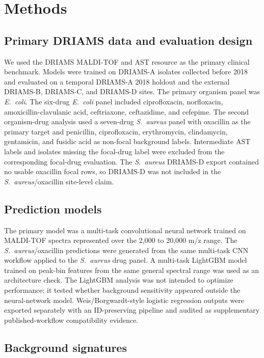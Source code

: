 \documentclass[11pt]{article}
\begin{document}
\section*{Methods}

\subsection*{Primary DRIAMS data and evaluation design}

We used the DRIAMS MALDI-TOF and AST resource as the primary clinical benchmark\cite{weis2022driams,driamsdryad}. Models were trained on DRIAMS-A isolates collected before 2018 and evaluated on a temporal DRIAMS-A 2018 holdout and the external DRIAMS-B, DRIAMS-C, and DRIAMS-D sites. The primary organism panel was \textit{E.~coli}. The six-drug \textit{E.~coli} panel included ciprofloxacin, norfloxacin, amoxicillin-clavulanic acid, ceftriaxone, ceftazidime, and cefepime. The second organism-drug analysis used a seven-drug \textit{S.~aureus} panel with oxacillin as the primary target and penicillin, ciprofloxacin, erythromycin, clindamycin, gentamicin, and fusidic acid as non-focal background labels. Intermediate AST labels and isolates missing the focal-drug label were excluded from the corresponding focal-drug evaluation. The \textit{S.~aureus} DRIAMS-D export contained no usable oxacillin focal rows, so DRIAMS-D was not included in the \textit{S.~aureus}/oxacillin site-level claim.

\subsection*{Prediction models}

The primary model was a multi-task convolutional neural network trained on MALDI-TOF spectra represented over the 2,000 to 20,000 m/z range. The \textit{S.~aureus}/oxacillin predictions were generated from the same multi-task CNN workflow applied to the \textit{S.~aureus} drug panel. A multi-task LightGBM model trained on peak-bin features from the same general spectral range was used as an architecture check. The LightGBM analysis was not intended to optimize performance; it tested whether background sensitivity appeared outside the neural-network model. Weis/Borgwardt-style logistic regression outputs were exported separately with an ID-preserving pipeline and audited as supplementary published-workflow compatibility evidence.

\subsection*{Background signatures}
\end{document}
